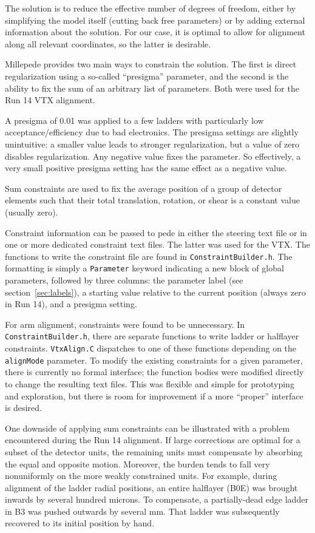 \documentclass[12pt]{article}
\begin{document}
The solution is to reduce the effective number of degrees of freedom, either by simplifying the model itself (cutting back free parameters) or by adding external information about the solution. For our case, it is optimal to allow for alignment along all relevant coordinates, so the latter is desirable.

Millepede provides two main ways to constrain the solution. The first is direct regularization using a so-called ``presigma'' parameter, and the second is the ability to fix the sum of an arbitrary list of parameters. Both were used for the Run 14 VTX alignment. 

A presigma of 0.01 was applied to a few ladders with particularly low acceptance/efficiency due to bad electronics. The presigma settings are slightly unintuitive: a smaller value leads to stronger regularization, but a value of zero disables regularization. Any negative value fixes the parameter. So effectively, a very small positive presigma setting has the same effect as a negative value.

Sum constraints are used to fix the average position of a group of detector elements such that their total translation, rotation, or shear is a constant value (usually zero).

Constraint information can be passed to pede in either the steering text file or in one or more dedicated constraint text files. The latter was used for the VTX. The functions to write the constraint file are found in \texttt{ConstraintBuilder.h}. The formatting is simply a \texttt{Parameter} keyword indicating a new block of global parameters, followed by three columns: the parameter label (see section~\ref{sec:labels}), a starting value relative to the current position (always zero in Run 14), and a presigma setting.

For arm alignment, constraints were found to be unnecessary. In \texttt{ConstraintBuilder.h}, there are separate functions to write ladder or halflayer constraints. \texttt{VtxAlign.C} dispatches to one of these functions depending on the \texttt{alignMode} parameter. To modify the existing constraints for a given parameter, there is currently no formal interface; the function bodies were modified directly to change the resulting text files. This was flexible and simple for prototyping and exploration, but there is room for improvement if a more ``proper'' interface is desired.

One downside of applying sum constraints can be illustrated with a problem encountered during the Run 14 alignment. If large corrections are optimal for a subset of the detector units, the remaining units must compensate by absorbing the equal and opposite motion. Moreover, the burden tends to fall very nonuniformly on the more weakly constrained units. For example, during alignment of the ladder radial positions, an entire halflayer (B0E) was brought inwards by several hundred microns. To compensate, a partially-dead edge ladder in B3 was pushed outwards by several mm. That ladder was subsequently recovered to its initial position by hand.
\end{document}
